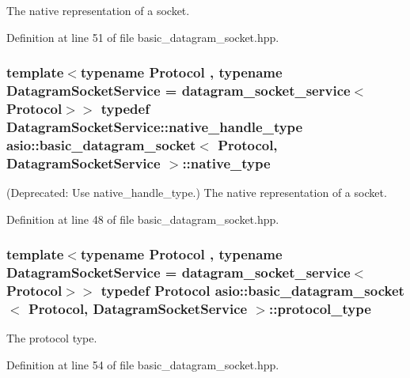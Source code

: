 The native representation of a socket. 



Definition at line 51 of file basic\+\_\+datagram\+\_\+socket.\+hpp.

\hypertarget{classasio_1_1basic__datagram__socket_ac8d4527707418c54b614980272cfa2fb}{}
\subsubsection[{native\+\_\+type}]{\setlength{\rightskip}{0pt plus 5cm}template$<$typename Protocol , typename Datagram\+Socket\+Service  = datagram\+\_\+socket\+\_\+service$<$\+Protocol$>$$>$ typedef Datagram\+Socket\+Service\+::native\+\_\+handle\+\_\+type {\bf asio\+::basic\+\_\+datagram\+\_\+socket}$<$ Protocol, Datagram\+Socket\+Service $>$\+::{\bf native\+\_\+type}}\label{classasio_1_1basic__datagram__socket_ac8d4527707418c54b614980272cfa2fb}
(Deprecated\+: Use native\+\_\+handle\+\_\+type.) The native representation of a socket. 

Definition at line 48 of file basic\+\_\+datagram\+\_\+socket.\+hpp.

\hypertarget{classasio_1_1basic__datagram__socket_ab65a458559daaa97ef48f6ee8ce46276}{}
\subsubsection[{protocol\+\_\+type}]{\setlength{\rightskip}{0pt plus 5cm}template$<$typename Protocol , typename Datagram\+Socket\+Service  = datagram\+\_\+socket\+\_\+service$<$\+Protocol$>$$>$ typedef Protocol {\bf asio\+::basic\+\_\+datagram\+\_\+socket}$<$ Protocol, Datagram\+Socket\+Service $>$\+::{\bf protocol\+\_\+type}}\label{classasio_1_1basic__datagram__socket_ab65a458559daaa97ef48f6ee8ce46276}


The protocol type. 



Definition at line 54 of file basic\+\_\+datagram\+\_\+socket.\+hpp.




